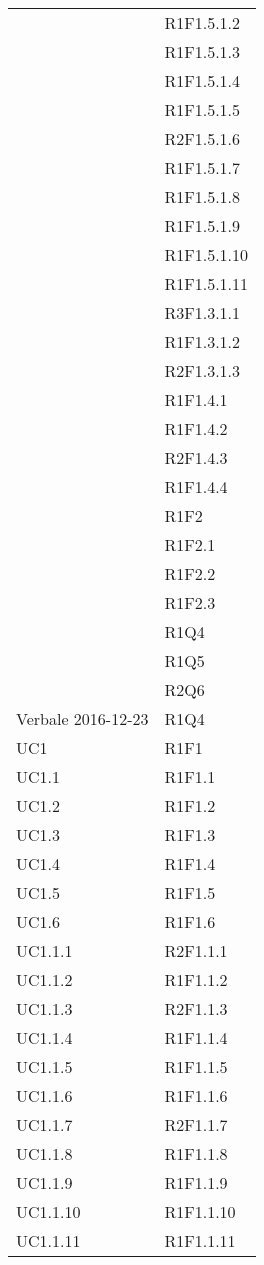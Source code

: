 \begin{longtable}{|>{\centering}m{5cm}|m{5cm}<{\centering}|}
&{R1F1.5.1.2}\\
&{R1F1.5.1.3}\\
&{R1F1.5.1.4}\\
&{R1F1.5.1.5}\\
&{R2F1.5.1.6}\\
&{R1F1.5.1.7}\\
&{R1F1.5.1.8}\\
&{R1F1.5.1.9}\\
&{R1F1.5.1.10}\\
&{R1F1.5.1.11}\\
&{R3F1.3.1.1}\\
&{R1F1.3.1.2}\\
&{R2F1.3.1.3}\\
&{R1F1.4.1}\\
&{R1F1.4.2}\\
&{R2F1.4.3}\\
&{R1F1.4.4}\\
&{R1F2}\\
&{R1F2.1}\\
&{R1F2.2}\\
&{R1F2.3}\\
&{R1Q4}\\
&{R1Q5}\\
&{R2Q6}\\ \hline
{Verbale 2016-12-23}&{R1Q4}\\ \hline
{UC1}&{R1F1}\\ \hline
{UC1.1}&{R1F1.1}\\ \hline
{UC1.2}&{R1F1.2}\\ \hline
{UC1.3}&{R1F1.3}\\ \hline
{UC1.4}&{R1F1.4}\\ \hline
{UC1.5}&{R1F1.5}\\ \hline
{UC1.6}&{R1F1.6}\\ \hline
{UC1.1.1}&{R2F1.1.1}\\ \hline
{UC1.1.2}&{R1F1.1.2}\\ \hline
{UC1.1.3}&{R2F1.1.3}\\ \hline
{UC1.1.4}&{R1F1.1.4}\\ \hline
{UC1.1.5}&{R1F1.1.5}\\ \hline
{UC1.1.6}&{R1F1.1.6}\\ \hline
{UC1.1.7}&{R2F1.1.7}\\ \hline
{UC1.1.8}&{R1F1.1.8}\\ \hline
{UC1.1.9}&{R1F1.1.9}\\ \hline
{UC1.1.10}&{R1F1.1.10}\\ \hline
{UC1.1.11}&{R1F1.1.11}\\ \hline

\end{longtable}
